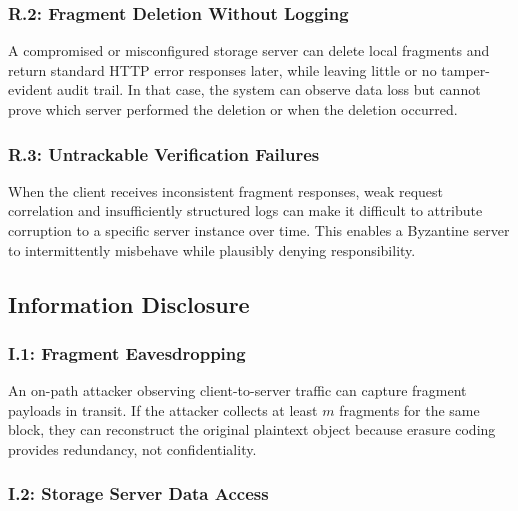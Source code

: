 \documentclass[../veristore_security_model.tex]{subfiles}
\begin{document}
\subsubsection{R.2: Fragment Deletion Without Logging}

A compromised or misconfigured storage server can delete local fragments and return standard
HTTP error responses later, while leaving little or no tamper-evident audit trail. In that
case, the system can observe data loss but cannot prove which server performed the deletion
or when the deletion occurred.

\subsubsection{R.3: Untrackable Verification Failures}

When the client receives inconsistent fragment responses, weak request correlation and
insufficiently structured logs can make it difficult to attribute corruption to a specific
server instance over time. This enables a Byzantine server to intermittently misbehave while
plausibly denying responsibility.

\subsection{Information Disclosure}


\subsubsection{I.1: Fragment Eavesdropping}

An on-path attacker observing client-to-server traffic can capture fragment payloads in transit.
If the attacker collects at least $m$ fragments for the same block, they can reconstruct the
original plaintext object because erasure coding provides redundancy, not confidentiality.

\subsubsection{I.2: Storage Server Data Access}
\end{document}

